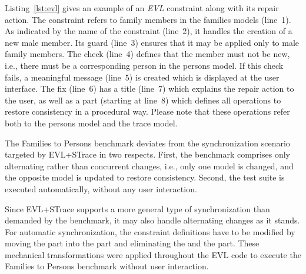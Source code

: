 Listing~\ref{lst:evl} gives an example of an \emph{EVL} constraint along with its repair action. The constraint refers to family members in the families models (line~1). As indicated by the name of the constraint (line~2), it handles the creation of a new male member. Its guard (line~3) ensures that it may be applied only to male family members. The check (line~4) defines that the member must not be new, i.e., there must be a corresponding person in the persons model. If this check fails, a meaningful message (line~5) is created which is displayed at the user interface. The fix (line~6) has a title (line~7) which explains the repair action to the user, as well as a  part (starting at line~8) which defines all operations to restore consistency in a procedural way. Please note that these operations refer both to the persons model and the trace model.


The Families to Persons benchmark deviates from the synchronization scenario targeted by EVL+STrace in two respects. First, the benchmark comprises only alternating rather than concurrent changes, i.e., only one model is changed, and the opposite model is updated to restore consistency. Second, the test suite is executed automatically, without any user interaction.

Since EVL+STrace supports a more general type of synchronization than demanded by the benchmark, it may also handle alternating changes as it stands. For automatic synchronization, the constraint definitions have to be modified by moving the  part into the  part and eliminating the  and the  part. These mechanical transformations were applied throughout the EVL code to execute the Families to Persons benchmark without user interaction. 